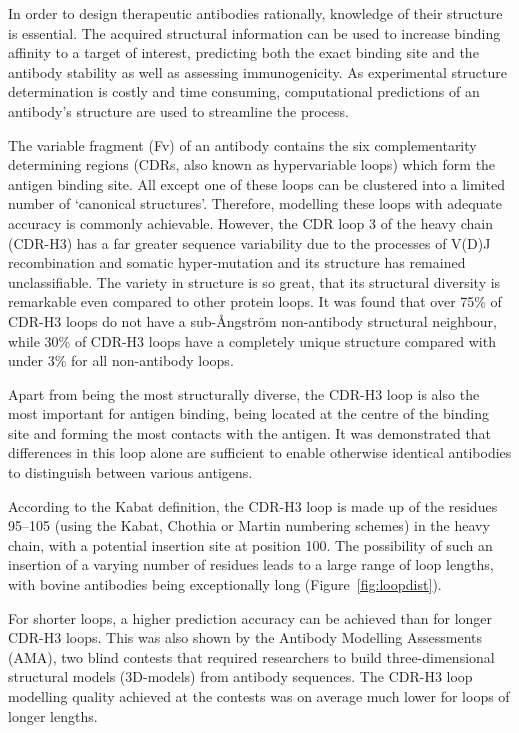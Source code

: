 \documentclass[12pt]{article}
\begin{document}
In order to design therapeutic antibodies rationally, knowledge of
their structure is essential. The acquired structural information can
be used to increase binding affinity to a target of interest,
predicting both the exact binding site and the antibody stability as
well as assessing immunogenicity\cite{Abhinandan2007}. As
experimental structure determination is costly and time
consuming, computational predictions of an antibody's structure are
used to streamline the process.

The variable
fragment (Fv) of an antibody contains the six complementarity determining regions
(CDRs, also known as hypervariable loops) which form the antigen binding site.
All except one of these loops can be clustered
into a limited number of `canonical structures'\cite{Al-Lazikani}. Therefore, modelling
these loops with adequate accuracy is commonly
achievable\cite{North2011}.  However, the CDR loop 3 of the 
heavy chain (CDR-H3) has a far greater sequence variability due to the
processes of V(D)J recombination and somatic hyper‐mutation and its
structure has remained unclassifiable\cite{Finn2016}. The variety in
structure is so great, that its structural diversity is remarkable
even compared to other protein loops\cite{Regep2017}. It was found
that over 75\% of CDR-H3 loops do not have a sub-{\AA}ngstr\"{o}m non-antibody
structural neighbour, while 30\% of CDR-H3 loops have a
completely unique structure compared with under 3\% for all non-antibody
loops\cite{Regep2017}.

Apart from being the most structurally diverse, the CDR-H3 loop is
also the most important for antigen binding, being located at the
centre of the binding site and forming the most contacts with the
antigen\cite{MacCallum1996}. It was demonstrated that
differences in this loop alone are sufficient to enable otherwise
identical antibodies to distinguish between various
antigens\cite{Xu2000}.

According to the Kabat definition, the CDR-H3 loop is made up of the
residues 95--105 (using the Kabat\cite{Kabat1992}, Chothia\cite{Al-Lazikani} or Martin\cite{Abhinandan2008} numbering schemes) in the heavy
chain, with a potential insertion site at position 100. The
possibility of such an insertion of a varying number of residues leads
to a large range of loop lengths, with bovine antibodies being
exceptionally long (Figure~\ref{fig:loopdist}).

For shorter loops, a higher prediction accuracy can be achieved than
for longer CDR-H3 loops. This was also shown by the Antibody Modelling
Assessments (AMA), two blind contests that required researchers to
build three-dimensional structural models (3D-models) from antibody sequences. The CDR-H3 loop
modelling quality achieved at the contests was on average much lower
for loops of longer lengths\cite{Almagro2011,Almagro2014}.
\end{document}
